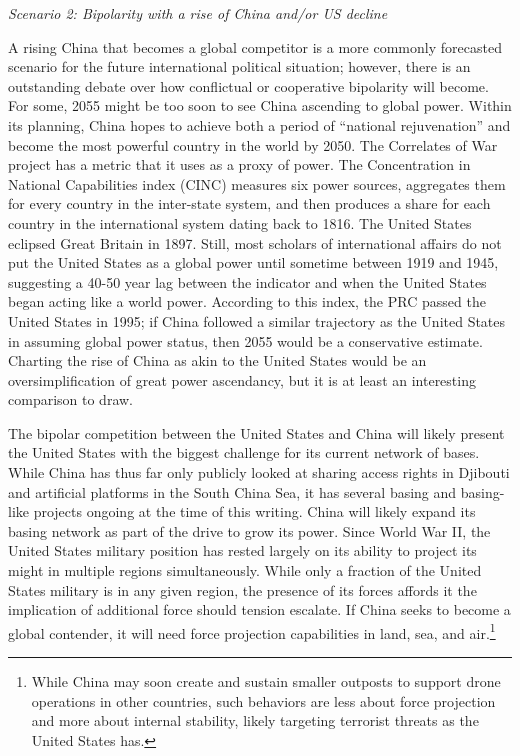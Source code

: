 

\textit{Scenario 2: Bipolarity with a rise of China and/or US decline}

A rising China that becomes a global competitor is a more commonly forecasted scenario for the future international political situation; however, there is an outstanding debate over how conflictual or cooperative bipolarity will become.\cite{maher2018,ross1999} For some, 2055 might be too soon to see China ascending to global power. Within its planning, China hopes to achieve both a period of ``national rejuvenation'' and become the most powerful country in the world by 2050.\cite{Doshi2021} The Correlates of War project has a metric that it uses as a proxy of power. The Concentration in National Capabilities index (CINC) measures six power sources, aggregates them for every country in the inter-state system, and then produces a share for each country in the international system dating back to 1816.\cite{Singer1972,Singer1987} The United States eclipsed Great Britain in 1897. Still, most scholars of international affairs do not put the United States as a global power until sometime between 1919 and 1945, suggesting a 40-50 year lag between the indicator and when the United States began acting like a world power. According to this index, the PRC passed the United States in 1995; if China followed a similar trajectory as the United States in assuming global power status, then 2055 would be a conservative estimate. Charting the rise of China as akin to the United States would be an oversimplification of great power ascendancy, but it is at least an interesting comparison to draw. 

The bipolar competition between the United States and China will likely present the United States with the biggest challenge for its current network of bases. While China has thus far only publicly looked at sharing access rights in Djibouti and artificial platforms in the South China Sea, it has several basing and basing-like projects ongoing at the time of this writing.\cite{Doshi2021} China will likely expand its basing network as part of the drive to grow its power. Since World War II, the United States military position has rested largely on its ability to project its might in multiple regions simultaneously. While only a fraction of the United States military is in any given region, the presence of its forces affords it the implication of additional force should tension escalate. If China seeks to become a global contender, it will need force projection capabilities in land, sea, and air.\footnote{While China may soon create and sustain smaller outposts to support drone operations in other countries, such behaviors are less about force projection and more about internal stability, likely targeting terrorist threats as the United States has.}

